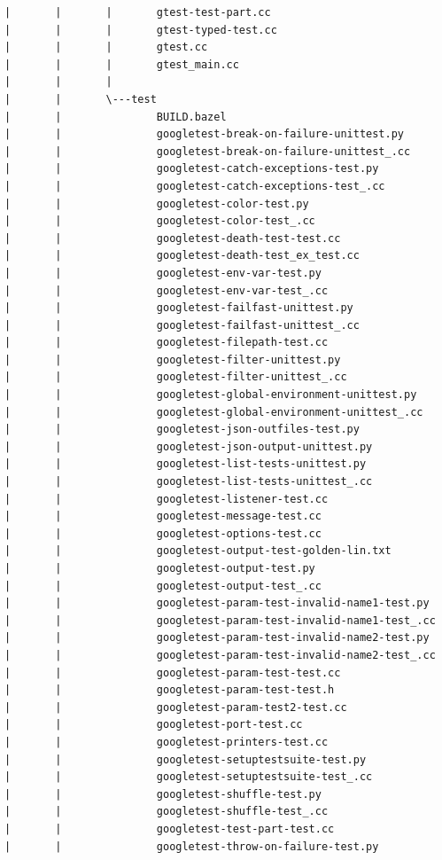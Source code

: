 \documentclass[a4paper,12pt]{article}
\begin{document}
\begin{verbatim}
|       |       |       gtest-test-part.cc
|       |       |       gtest-typed-test.cc
|       |       |       gtest.cc
|       |       |       gtest_main.cc
|       |       |       
|       |       \---test
|       |               BUILD.bazel
|       |               googletest-break-on-failure-unittest.py
|       |               googletest-break-on-failure-unittest_.cc
|       |               googletest-catch-exceptions-test.py
|       |               googletest-catch-exceptions-test_.cc
|       |               googletest-color-test.py
|       |               googletest-color-test_.cc
|       |               googletest-death-test-test.cc
|       |               googletest-death-test_ex_test.cc
|       |               googletest-env-var-test.py
|       |               googletest-env-var-test_.cc
|       |               googletest-failfast-unittest.py
|       |               googletest-failfast-unittest_.cc
|       |               googletest-filepath-test.cc
|       |               googletest-filter-unittest.py
|       |               googletest-filter-unittest_.cc
|       |               googletest-global-environment-unittest.py
|       |               googletest-global-environment-unittest_.cc
|       |               googletest-json-outfiles-test.py
|       |               googletest-json-output-unittest.py
|       |               googletest-list-tests-unittest.py
|       |               googletest-list-tests-unittest_.cc
|       |               googletest-listener-test.cc
|       |               googletest-message-test.cc
|       |               googletest-options-test.cc
|       |               googletest-output-test-golden-lin.txt
|       |               googletest-output-test.py
|       |               googletest-output-test_.cc
|       |               googletest-param-test-invalid-name1-test.py
|       |               googletest-param-test-invalid-name1-test_.cc
|       |               googletest-param-test-invalid-name2-test.py
|       |               googletest-param-test-invalid-name2-test_.cc
|       |               googletest-param-test-test.cc
|       |               googletest-param-test-test.h
|       |               googletest-param-test2-test.cc
|       |               googletest-port-test.cc
|       |               googletest-printers-test.cc
|       |               googletest-setuptestsuite-test.py
|       |               googletest-setuptestsuite-test_.cc
|       |               googletest-shuffle-test.py
|       |               googletest-shuffle-test_.cc
|       |               googletest-test-part-test.cc
|       |               googletest-throw-on-failure-test.py

\end{verbatim}
\end{document}
